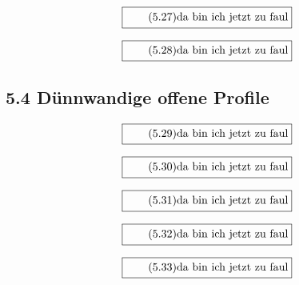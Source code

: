 \documentclass[11pt]{article}
\newcommand{\1}{ {\mathds{1}} }
\begin{document}
    \begin{equation}
      \boxed{
        \tag{5.27}
        \begin{split}
          \text{da bin ich jetzt zu faul}
        \end{split}
      }
    \end{equation}
    
    \begin{equation}
      \boxed{
        \tag{5.28}
        \begin{split}
          \text{da bin ich jetzt zu faul}
        \end{split}
      }
    \end{equation}

    \subsection*{5.4 Dünnwandige offene Profile}

    \begin{equation}
      \boxed{
        \tag{5.29}
        \begin{split}
          \text{da bin ich jetzt zu faul}
        \end{split}
      }
    \end{equation}

    \begin{equation}
      \boxed{
        \tag{5.30}
        \begin{split}
          \text{da bin ich jetzt zu faul}
        \end{split}
      }
    \end{equation}

    \begin{equation}
      \boxed{
        \tag{5.31}
        \begin{split}
          \text{da bin ich jetzt zu faul}
        \end{split}
      }
    \end{equation}

    \begin{equation}
      \boxed{
        \tag{5.32}
        \begin{split}
          \text{da bin ich jetzt zu faul}
        \end{split}
      }
    \end{equation}

    \begin{equation}
      \boxed{
        \tag{5.33}
        \begin{split}
          \text{da bin ich jetzt zu faul}
        \end{split}
      }
    \end{equation}
\end{document}
